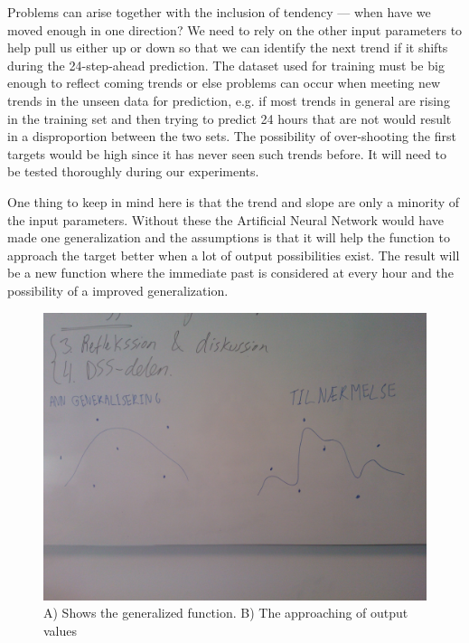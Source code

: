Problems can arise together with the inclusion of tendency --- when have we moved enough in one direction? We need to rely on the other input parameters to help pull us either up or down so that we can identify the next trend if it shifts during the 24-step-ahead prediction. The dataset used for training must be big enough to reflect coming trends or else problems can occur when meeting new trends in the unseen data for prediction, e.g. if most trends in general are rising in the training set and then trying to predict 24 hours that are not would result in a disproportion between the two sets. The possibility of over-shooting the first targets would be high since it has never seen such trends before. It will need to be tested thoroughly during our experiments. 

One thing to keep in mind here is that the trend and slope are only a minority of the input parameters. Without these the Artificial Neural Network would have made one generalization and the assumptions is that it will help the function to approach the target better when a lot of output possibilities exist. The result will be a new function where the immediate past is considered at every hour and the possibility of a improved generalization.

\begin{figure}[H]
\centering
\includegraphics[width=0.99\linewidth,natwidth=898,natheight=587]{billeder/WP_000057.jpg}
\caption{A) Shows the generalized function. B) The approaching of output values}
\label{fig:WP}
\end{figure}


